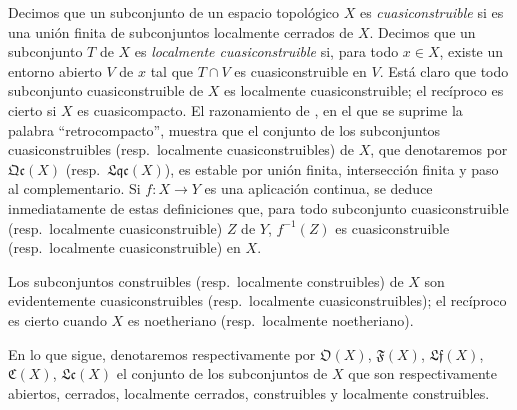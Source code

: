 \begin{env}[10.1.1]
\label{IV.10.1.1}
Decimos que un subconjunto de un espacio topológico $X$ es \emph{cuasiconstruible} si es una unión finita de subconjuntos localmente cerrados de $X$.
Decimos que un subconjunto $T$ de $X$ es \emph{localmente cuasiconstruible} si, para todo $x\in X$, existe un entorno abierto $V$ de $x$ tal que $T\cap V$ es cuasiconstruible en $V$.
Está claro que todo subconjunto cuasiconstruible de $X$ es localmente cuasiconstruible; el recíproco es cierto si $X$ es cuasicompacto.
El razonamiento de , en el que se suprime la palabra ``retrocompacto'', muestra que el conjunto de los subconjuntos cuasiconstruibles (resp.\ localmente cuasiconstruibles) de $X$, que denotaremos por $\mathfrak{Qc}(X)$ (resp.\ $\mathfrak{Lqc}(X)$), es estable por unión finita, intersección finita y paso al complementario.
Si $f:X\to Y$ es una aplicación continua, se deduce inmediatamente de estas definiciones que, para todo subconjunto cuasiconstruible (resp.\ localmente cuasiconstruible) $Z$ de $Y$, $f^{-1}(Z)$ es cuasiconstruible (resp.\ localmente cuasiconstruible) en $X$.

Los subconjuntos construibles (resp.\ localmente construibles) de $X$ son evidentemente cuasiconstruibles (resp.\ localmente cuasiconstruibles); el recíproco es cierto cuando $X$ es noetheriano (resp.\ localmente noetheriano).

En lo que sigue, denotaremos respectivamente por $\mathfrak{O}(X)$, $\mathfrak{F}(X)$, $\mathfrak{Lf}(X)$, $\mathfrak{C}(X)$, $\mathfrak{Lc}(X)$ el conjunto de los subconjuntos de $X$ que son respectivamente abiertos, cerrados, localmente cerrados, construibles y localmente construibles.
\end{env}


